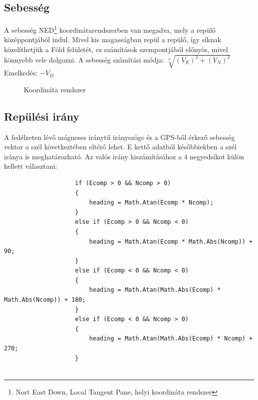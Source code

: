 \documentclass[12pt]{article}
\begin{document}
\begin{itemize}
\subsection{Sebesség}
A sebesség NED\footnote{Nort East Down, Local Tangent Pane, helyi koordináta rendszer} koordinátarendszerben van megadva, mely a repül\H{o} középpontjából indul. Mivel kis magasságban repül a repül\H{o}, így síknak közelíthetjük  a Föld felületét, ez számítások szempontjából el\H{o}nyös, mivel könnyebb vele dolgozni.
A sebesség számítási módja: $ \sqrt[2]{(V_E)^2 + (V_N)^2}$ \\
Emelkedés: $ -V_D$
\begin{figure}[H]
	\centering
	\caption{Koordináta rendszer}
	\label{fig:ned}
\end{figure}

\subsection{Repülési irány}
A fedélzeten lév\H{o} mágneses irányt\H{u} irányszöge és a GPS-b\H{o}l érkez\H{o} sebesség vektor a szél következtében eltér\H{o} lehet. E kett\H{o} adatból kés\H{o}bbiekben a szél iránya is meghatározható.
Az valós irány kiszámításához a 4 negyedsíkot külön kellett választani:
\begin{verbatim}
					if (Ecomp > 0 && Ncomp > 0)
					{
						heading = Math.Atan(Ecomp * Ncomp);
					}
					else if (Ecomp > 0 && Ncomp < 0)
					{
						heading = Math.Atan(Ecomp * Math.Abs(Ncomp)) + 90;
					}
					else if (Ecomp < 0 && Ncomp < 0)
					{
						heading = Math.Atan(Math.Abs(Ecomp) * Math.Abs(Ncomp)) + 180;
					}
					else if (Ecomp < 0 && Ncomp > 0)
					{
						heading = Math.Atan(Math.Abs(Ecomp) * Ncomp) + 270;
					}


\end{verbatim}
\end{itemize}
\end{document}
